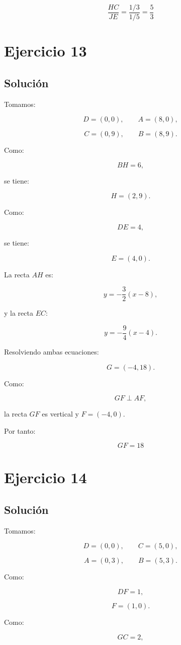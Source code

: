 \documentclass[11pt,a4paper]{article}
\begin{document}
\[
\boxed{
\frac{HC}{JE}
=
\frac{1/3}{1/5}
=
\frac53
}
\]

\section{Ejercicio 13}
\subsection{Solución}

Tomamos:

\[
D=(0,0),
\qquad
A=(8,0),
\]

\[
C=(0,9),
\qquad
B=(8,9).
\]

Como:

\[
BH=6,
\]

se tiene:

\[
H=(2,9).
\]

Como:

\[
DE=4,
\]

se tiene:

\[
E=(4,0).
\]

La recta \(AH\) es:

\[
y=-\frac32(x-8),
\]

y la recta \(EC\):

\[
y=-\frac94(x-4).
\]

Resolviendo ambas ecuaciones:

\[
G=(-4,18).
\]

Como:

\[
GF\perp AF,
\]

la recta \(GF\) es vertical y \(F=(-4,0)\).

Por tanto:

\[
\boxed{GF=18}
\]

\section{Ejercicio 14}
\subsection{Solución}

Tomamos:

\[
D=(0,0),
\qquad
C=(5,0),
\]

\[
A=(0,3),
\qquad
B=(5,3).
\]

Como:

\[
DF=1,
\]

\[
F=(1,0).
\]

Como:

\[
GC=2,
\]
\end{document}
